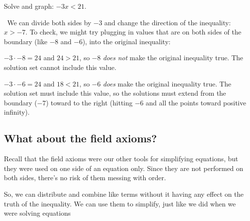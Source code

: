 \begin{boxedex}
Solve and graph: $-3x < 21$.

\exsoln\ We can divide both sides by $-3$ and change the direction of the inequality: $x > -7$. To check, we might try plugging in values that are on both sides of the boundary (like $-8$ and $-6$), into the original inequality:

$-3 \cdot -8 = 24$ and $24 > 21$, so $-8$ \textit{does not} make the original inequality true. The solution set cannot include this value.

$-3 \cdot -6 = 24$ and $18 < 21$, so $-6$ \textit{does} make the original inequality true. The solution set must include this value, so the solutions must extend from the boundary ($-7$) toward to the right (hitting $-6$ and all the points toward positive infinity).

\begin{center}
\end{center}
\end{boxedex}

\subsection{What about the field axioms?}

Recall that the field axioms were our other tools for simplifying equations, but they were used on one side of an equation only. Since they are not performed on both sides, there's no risk of them messing with order.

So, we can distribute and combine like terms without it having any effect on the truth of the inequality. We can use them to simplify, just like we did when we were solving equations

